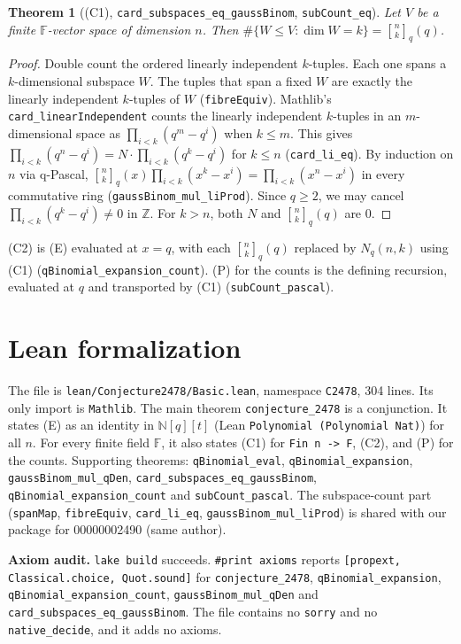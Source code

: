 \documentclass[11pt]{article}
\newtheorem{theorem}{Theorem}
\theoremstyle{definition}
\newcommand{\qb}[2]{\genfrac{[}{]}{0pt}{}{#1}{#2}_{q}}
\newcommand{\F}{\mathbb{F}}
\begin{document}
\begin{theorem}[(C1), \texttt{card\_subspaces\_eq\_gaussBinom}, \texttt{subCount\_eq}]
Let $V$ be a finite $\F$-vector space of dimension $n$. Then
$\#\{W\le V:\dim W=k\}=\qb nk(q)$.
\end{theorem}
\begin{proof}
Double count the ordered linearly independent $k$-tuples. Each one spans a $k$-dimensional
subspace $W$. The tuples that span a fixed $W$ are exactly the linearly independent $k$-tuples
of $W$ (\texttt{fibreEquiv}). Mathlib's \texttt{card\_linearIndependent} counts the linearly
independent $k$-tuples in an $m$-dimensional space as $\prod_{i<k}(q^m-q^i)$ when $k\le m$. This
gives $\prod_{i<k}(q^n-q^i)=N\cdot\prod_{i<k}(q^k-q^i)$ for $k\le n$ (\texttt{card\_li\_eq}).
By induction on $n$ via q-Pascal,
$\qb nk(x)\prod_{i<k}(x^k-x^i)=\prod_{i<k}(x^n-x^i)$ in every commutative ring
(\texttt{gaussBinom\_mul\_liProd}). Since $q\ge2$, we may cancel
$\prod_{i<k}(q^k-q^i)\neq0$ in $\mathbb{Z}$. For $k>n$, both $N$ and $\qb nk(q)$ are $0$.
\end{proof}

(C2) is (E) evaluated at $x=q$, with each $\qb nk(q)$ replaced by $N_q(n,k)$ using (C1)
(\texttt{qBinomial\_expansion\_count}). (P) for the counts is the defining recursion, evaluated
at $q$ and transported by (C1) (\texttt{subCount\_pascal}).

\section{Lean formalization}

The file is \texttt{lean/Conjecture2478/Basic.lean}, namespace \texttt{C2478}, 304 lines. Its
only import is \texttt{Mathlib}. The main theorem \texttt{conjecture\_2478} is a conjunction.
It states (E) as an identity in $\mathbb{N}[q][t]$ (Lean \texttt{Polynomial (Polynomial Nat)})
for all $n$. For every finite field $\F$, it also states (C1) for \texttt{Fin n -> F}, (C2), and
(P) for the counts. Supporting theorems: \texttt{qBinomial\_eval},
\texttt{qBinomial\_expansion}, \texttt{gaussBinom\_mul\_qDen},
\texttt{card\_subspaces\_eq\_gaussBinom}, \texttt{qBinomial\_expansion\_count} and
\texttt{subCount\_pascal}. The subspace-count part (\texttt{spanMap}, \texttt{fibreEquiv},
\texttt{card\_li\_eq}, \texttt{gaussBinom\_mul\_liProd}) is shared with our package for
00000002490 (same author).

\textbf{Axiom audit.} \texttt{lake build} succeeds. \texttt{\#print axioms} reports
\texttt{[propext, Classical.choice, Quot.sound]} for \texttt{conjecture\_2478},
\texttt{qBinomial\_expansion}, \texttt{qBinomial\_expansion\_count},
\texttt{gaussBinom\_mul\_qDen} and \texttt{card\_subspaces\_eq\_gaussBinom}. The file contains
no \texttt{sorry} and no \texttt{native\_decide}, and it adds no axioms.
\end{document}
